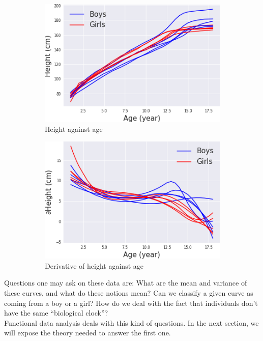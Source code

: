 \documentclass[10pt, a4paper]{report}
\theoremstyle{definition}
\theoremstyle{remark}
\begin{document}
\begin{figure}[H]
	\centering
	\begin{subfigure}{.5\textwidth}
		\centering
		\includegraphics[width=.8\linewidth]{Code/images/11/growth}
		\caption{Height against age}
	\end{subfigure}%
	\begin{subfigure}{.5\textwidth}
		\centering
		\includegraphics[width=.8\linewidth]{Code/images/11/dgrowth}
		\caption{Derivative of height against age}
	\end{subfigure}
	\caption{}
	\label{fig:growth}
\end{figure}
Questions one may ask on these data are: What are the mean and variance of these curves, and what do these notions mean? Can we classify a given curve as coming from a boy or a girl? How do we deal with the fact that individuals don't have the same ``biological clock''?\\
Functional data analysis deals with this kind of questions. In the next section, we will expose the theory needed to answer the first one.
\end{document}
